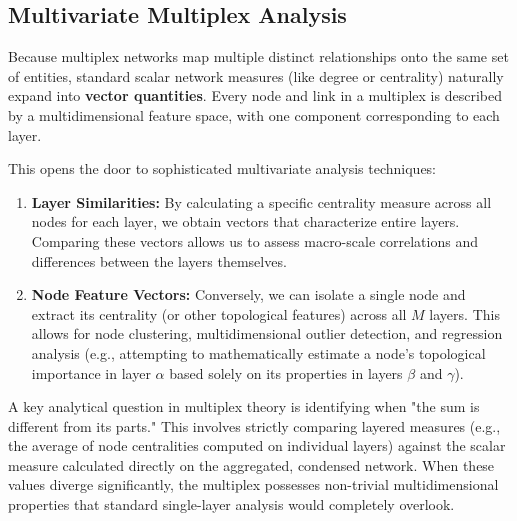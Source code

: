 
\subsection{Multivariate Multiplex Analysis}
\label{subsec:multivariate_multiplex_analysis}

Because multiplex networks map multiple distinct relationships onto the same set of entities, standard scalar network measures (like degree or centrality) naturally expand into \textbf{vector quantities}. Every node and link in a multiplex is described by a multidimensional feature space, with one component corresponding to each layer.

This opens the door to sophisticated multivariate analysis techniques:
\begin{enumerate}
    \item \textbf{Layer Similarities:} By calculating a specific centrality measure across all nodes for each layer, we obtain vectors that characterize entire layers. Comparing these vectors allows us to assess macro-scale correlations and differences between the layers themselves.
    \item \textbf{Node Feature Vectors:} Conversely, we can isolate a single node and extract its centrality (or other topological features) across all \(M\) layers. This allows for node clustering, multidimensional outlier detection, and regression analysis (e.g., attempting to mathematically estimate a node's topological importance in layer \(\alpha\) based solely on its properties in layers \(\beta\) and \(\gamma\)).
\end{enumerate}

A key analytical question in multiplex theory is identifying when "the sum is different from its parts." This involves strictly comparing layered measures (e.g., the average of node centralities computed on individual layers) against the scalar measure calculated directly on the aggregated, condensed network. When these values diverge significantly, the multiplex possesses non-trivial multidimensional properties that standard single-layer analysis would completely overlook.

